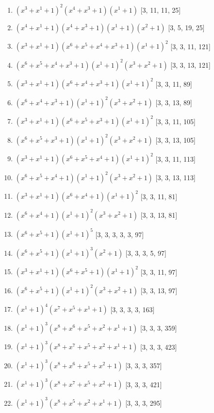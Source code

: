 \documentclass[10pt,twocolumn]{article}
\begin{document}
\begin{enumerate}
\item $(x^{3} + x^{1} + 1)^{2}(x^{4} + x^{3} + 1)(x^{1} + 1)$  [3, 11, 11, 25]
\item $(x^{4} + x^{1} + 1)(x^{4} + x^{3} + 1)(x^{1} + 1)(x^{2} + 1)$  [3, 5, 19, 25]
\item $(x^{3} + x^{1} + 1)(x^{6} + x^{5} + x^{4} + x^{3} + 1)(x^{1} + 1)^{2}$  [3, 3, 11, 121]
\item $(x^{6} + x^{5} + x^{4} + x^{3} + 1)(x^{1} + 1)^{2}(x^{3} + x^{2} + 1)$  [3, 3, 13, 121]
\item $(x^{3} + x^{1} + 1)(x^{6} + x^{4} + x^{3} + 1)(x^{1} + 1)^{2}$  [3, 3, 11, 89]
\item $(x^{6} + x^{4} + x^{3} + 1)(x^{1} + 1)^{2}(x^{3} + x^{2} + 1)$  [3, 3, 13, 89]
\item $(x^{3} + x^{1} + 1)(x^{6} + x^{5} + x^{3} + 1)(x^{1} + 1)^{2}$  [3, 3, 11, 105]
\item $(x^{6} + x^{5} + x^{3} + 1)(x^{1} + 1)^{2}(x^{3} + x^{2} + 1)$  [3, 3, 13, 105]
\item $(x^{3} + x^{1} + 1)(x^{6} + x^{5} + x^{4} + 1)(x^{1} + 1)^{2}$  [3, 3, 11, 113]
\item $(x^{6} + x^{5} + x^{4} + 1)(x^{1} + 1)^{2}(x^{3} + x^{2} + 1)$  [3, 3, 13, 113]
\item $(x^{3} + x^{1} + 1)(x^{6} + x^{4} + 1)(x^{1} + 1)^{2}$  [3, 3, 11, 81]
\item $(x^{6} + x^{4} + 1)(x^{1} + 1)^{2}(x^{3} + x^{2} + 1)$  [3, 3, 13, 81]
\item $(x^{6} + x^{5} + 1)(x^{1} + 1)^{5}$  [3, 3, 3, 3, 3, 97]
\item $(x^{6} + x^{5} + 1)(x^{1} + 1)^{3}(x^{2} + 1)$  [3, 3, 3, 5, 97]
\item $(x^{3} + x^{1} + 1)(x^{6} + x^{5} + 1)(x^{1} + 1)^{2}$  [3, 3, 11, 97]
\item $(x^{6} + x^{5} + 1)(x^{1} + 1)^{2}(x^{3} + x^{2} + 1)$  [3, 3, 13, 97]
\item $(x^{1} + 1)^{4}(x^{7} + x^{5} + x^{1} + 1)$  [3, 3, 3, 3, 163]
\item $(x^{1} + 1)^{3}(x^{8} + x^{6} + x^{5} + x^{2} + x^{1} + 1)$  [3, 3, 3, 359]
\item $(x^{1} + 1)^{3}(x^{8} + x^{7} + x^{5} + x^{2} + x^{1} + 1)$  [3, 3, 3, 423]
\item $(x^{1} + 1)^{3}(x^{8} + x^{6} + x^{5} + x^{2} + 1)$  [3, 3, 3, 357]
\item $(x^{1} + 1)^{3}(x^{8} + x^{7} + x^{5} + x^{2} + 1)$  [3, 3, 3, 421]
\item $(x^{1} + 1)^{3}(x^{8} + x^{5} + x^{2} + x^{1} + 1)$  [3, 3, 3, 295]

\end{enumerate}
\end{document}
